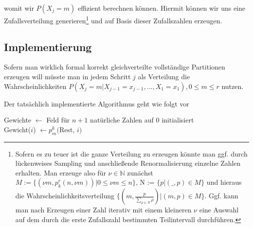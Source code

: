 \documentclass{article}
\begin{document}
womit wir $P(X_j=m)$ effizient berechnen können. Hiermit können wir uns eine Zufallsverteilung generieren\footnote{Sofern es zu teuer ist die ganze Verteilung zu erzeugen könnte man ggf. durch lückenweises Sampling und anschließende Renormalisierung einzelne Zahlen erhalten. Man erzeuge also für $\nu \in \mathbb{N}$ zunächst $M := \{(\nu m, p_k^r(n, \nu m)) | 0 \leq \nu m \leq n\}$, N := $\{p | (\_, p) \in M\}$ und hieraus die Wahrscheinlichkeitsverteilung $\{(m, \frac{p}{\sum_{\rho \in N} \rho}) | (m,p) \in M\}$. Ggf. kann man nach Erzeugen einer Zahl iterativ mit einem kleineren $\nu$ eine Auswahl auf dem durch die erste Zufallszahl bestimmten Teilintervall durchführen.} und auf Basis dieser Zufallszahlen erzeugen.

\subsection{Implementierung}

Sofern man wirklich formal korrekt gleichverteilte vollständige Partitionen erzeugen will müsste man in jedem Schritt $j$ als Verteilung die Wahrscheinlichkeiten $P(X_j=m | X_{j-1}=x_{j-1},...,X_1=x_1), 0 \leq m \leq r$ nutzen.

Der tatsächlich implementierte Algorithmus geht wie folgt vor

\begin{algorithm}[H]
    Gewichte $\leftarrow$ Feld für $n+1$ natürliche Zahlen auf $0$ initialisiert \\
     {
        Gewicht($i$) $\leftarrow p_m^k($Rest, $i)$ \\
    }
\end{algorithm}
\end{document}
